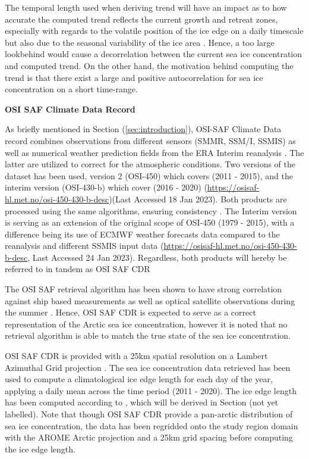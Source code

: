 \documentclass[../main/thesis.tex]{subfiles}
\begin{document}
The temporal length used when deriving trend will have an impact as to how accurate the computed trend reflects the current growth and retreat zones, especially with regards to the volatile position of the ice edge on a daily timescale but also due to the seasonal variability of the ice area \citep{Holland2016}. Hence, a too large lookbehind would cause a decorrelation between the current sea ice concentration and computed trend. On the other hand, the motivation behind computing the trend is that there exist a large and positive autocorrelation for sea ice concentration on a short time-range. 

\textbf{OSI SAF Climate Data Record}

As briefly mentioned in Section (\ref{sec:introduction}), OSI-SAF Climate Data record combines observations from different sensors (SMMR, SSM/I, SSMIS) as well as numerical weather prediction fields from the ERA Interim reanalysis \citep{Dee2011}. The latter are utilized to correct for the atmospheric conditions. Two versions of the dataset has been used, version 2 (OSI-450) which covers (2011 - 2015), and the interim version (OSI-430-b) which cover (2016 - 2020) (\url{https://osisaf-hl.met.no/osi-450-430-b-desc})(Last Accessed 18 Jan 2023). Both products are processed using the same algorithms, ensuring consistency \citep{Lavergne2019a}. The Interim version is serving as an extension of the original scope of OSI-450 (1979 - 2015), with a difference being its use of ECMWF weather forecasts data compared to the reanalysis and different SSMIS input data (\url{https://osisaf-hl.met.no/osi-450-430-b-desc}, Last Accessed 24 Jan 2023). Regardless, both products will hereby be referred to in tandem as OSI SAF CDR

The OSI SAF retrieval algorithm has been shown to have strong correlation against ship based measurements \citep{Kern2019} as well as optical satellite observations during the summer \citep{Kern2020}. Hence, OSI SAF CDR is expected to serve as a correct representation of the Arctic sea ice concentration, however it is noted that no retrieval algorithm is able to match the true state of the sea ice concentration.

OSI SAF CDR is provided with a 25km spatial resolution on a Lambert Azimuthal Grid projection \citep{Soerensen2021}. The sea ice concentration data retrieved has been used to compute a climatological ice edge length for each day of the year, applying a daily mean across the time period (2011 - 2020). The ice edge length has been computed according to \citep{Melsom2019}, which will be derived in Section (not yet labelled). Note that though OSI SAF CDR provide a pan-arctic distribution of sea ice concentration, the data has been regridded onto the study region domain with the  AROME Arctic projection and a 25km grid spacing before computing the ice edge length.
\end{document}
